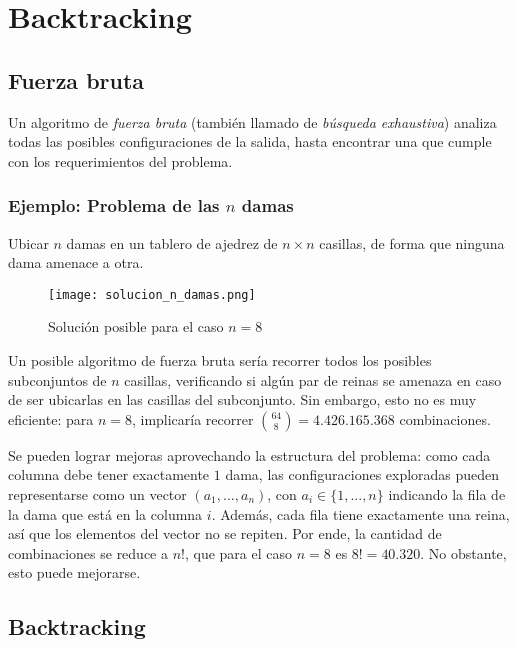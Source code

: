 \section{Backtracking}

\subsection{Fuerza bruta}

Un algoritmo de \textit{fuerza bruta} (también llamado de \textit{búsqueda exhaustiva}) analiza todas las posibles configuraciones de la salida, hasta encontrar una que cumple con los requerimientos del problema.

\subsubsection{Ejemplo: Problema de las $n$ damas}

\begin{problema}
    Ubicar $n$ damas en un tablero de ajedrez de $n \times n$ casillas, de forma que ninguna dama amenace a otra.
\end{problema}

\begin{figure}[H]
    \centering
    \texttt{[image: solucion\_n\_damas.png]}
    \caption*{Solución posible para el caso $n = 8$}
\end{figure}

Un posible algoritmo de fuerza bruta sería recorrer todos los posibles subconjuntos de $n$ casillas, verificando si algún par de reinas se amenaza en caso de ser ubicarlas en las casillas del subconjunto. Sin embargo, esto no es muy eficiente: para $n = 8$, implicaría recorrer $\binom{64}{8} = 4.426.165.368$ combinaciones.

Se pueden lograr mejoras aprovechando la estructura del problema: como cada columna debe tener exactamente $1$ dama, las configuraciones exploradas pueden representarse como un vector $(a_1, ..., a_n)$, con $a_i \in \{1, ..., n\}$ indicando la fila de la dama que está en la columna $i$. Además, cada fila tiene exactamente una reina, así que los elementos del vector no se repiten. Por ende, la cantidad de combinaciones se reduce a $n!$, que para el caso $n=8$ es $8! = 40.320$. No obstante, esto puede mejorarse.

\subsection{Backtracking}

